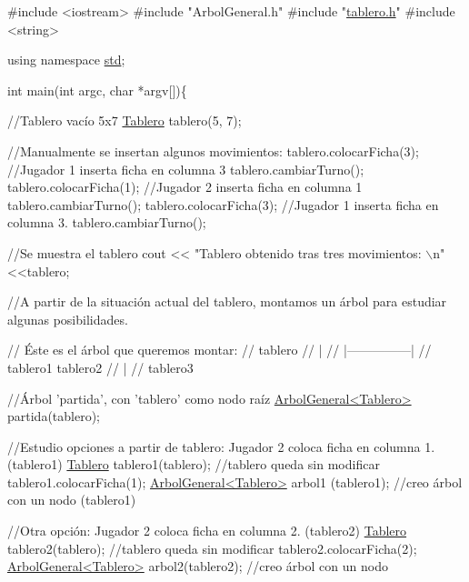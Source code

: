 \begin{DoxyCode}
\textcolor{preprocessor}{#include <iostream>}
\textcolor{preprocessor}{#include "ArbolGeneral.h"}
\textcolor{preprocessor}{#include "\hyperlink{tablero_8h}{tablero.h}"}
\textcolor{preprocessor}{#include <string>}

\textcolor{keyword}{using namespace }\hyperlink{namespacestd}{std};


\textcolor{keywordtype}{int} main(\textcolor{keywordtype}{int} argc, \textcolor{keywordtype}{char} *argv[])\{

  \textcolor{comment}{//Tablero vacío 5x7}
    \hyperlink{classTablero}{Tablero} tablero(5, 7);

    \textcolor{comment}{//Manualmente se insertan algunos movimientos: }
    tablero.colocarFicha(3);  \textcolor{comment}{//Jugador 1 inserta ficha en columna 3}
    tablero.cambiarTurno();
    tablero.colocarFicha(1);  \textcolor{comment}{//Jugador 2 inserta ficha en columna 1}
    tablero.cambiarTurno();
    tablero.colocarFicha(3);  \textcolor{comment}{//Jugador 1 inserta ficha en columna 3.}
    tablero.cambiarTurno();
    
    \textcolor{comment}{//Se muestra el tablero }
    cout << \textcolor{stringliteral}{"Tablero obtenido tras tres movimientos: \(\backslash\)n"}<<tablero; 

    \textcolor{comment}{//A partir de la situación actual del tablero, montamos un árbol para estudiar algunas posibilidades. }

    \textcolor{comment}{// Éste es el árbol que queremos montar: }
    \textcolor{comment}{//        tablero}
    \textcolor{comment}{//          |}
    \textcolor{comment}{//      |---------------|}
    \textcolor{comment}{//    tablero1      tablero2}
    \textcolor{comment}{//                      |}
    \textcolor{comment}{//                  tablero3}


    \textcolor{comment}{//Árbol 'partida', con 'tablero' como nodo raíz}
    \hyperlink{classArbolGeneral}{ArbolGeneral<Tablero>} partida(tablero);

    \textcolor{comment}{//Estudio opciones a partir de tablero: Jugador 2 coloca ficha en columna 1. (tablero1)}
    \hyperlink{classTablero}{Tablero} tablero1(tablero);          \textcolor{comment}{//tablero queda sin modificar}
    tablero1.colocarFicha(1);   
    \hyperlink{classArbolGeneral}{ArbolGeneral<Tablero>} arbol1 (tablero1);  \textcolor{comment}{//creo árbol con un nodo (tablero1)}

    \textcolor{comment}{//Otra opción: Jugador 2 coloca ficha en columna 2. (tablero2)}
    \hyperlink{classTablero}{Tablero} tablero2(tablero);          \textcolor{comment}{//tablero queda sin modificar}
    tablero2.colocarFicha(2);
    \hyperlink{classArbolGeneral}{ArbolGeneral<Tablero>} arbol2(tablero2);   \textcolor{comment}{//creo árbol con un nodo}


\end{DoxyCode}
